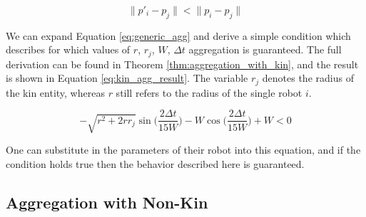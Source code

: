 \documentclass[conference]{IEEEtran}
\begin{document}
    \begin{equation} \label{eq:generic_agg}
      \lVert p'_i - p_j \rVert < \lVert p_i - p_j \rVert
    \end{equation}

    We can expand Equation \eqref{eq:generic_agg} and derive a simple condition which describes for which values of $r$, $r_j$, $W$, $\Delta t$ aggregation is guaranteed. The full derivation can be found in Theorem \ref{thm:aggregation_with_kin}, and the result is shown in Equation \eqref{eq:kin_agg_result}. The variable $r_j$ denotes the radius of the kin entity, whereas $r$ still refers to the radius of the single robot $i$.

    \begin{equation} \label{eq:kin_agg_result}
      -\sqrt{r^2+2rr_j}\sin\bigg(\frac{2\Delta t}{15W}\bigg) - W\cos\bigg(\frac{2\Delta t}{15W}\bigg) + W < 0
    \end{equation}

    One can substitute in the parameters of their robot into this equation, and if the condition holds true then the behavior described here is guaranteed.

  \subsection{Aggregation with Non-Kin}
\end{document}

